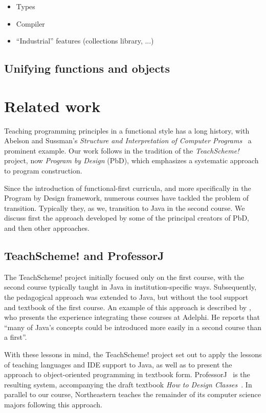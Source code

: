 \documentclass[submission,copyright]{eptcs}
\begin{document}
\begin{itemize}
\item Types
\item Compiler
\item ``Industrial'' features (collections library, ...)
\end{itemize}



\subsection{Unifying functions and objects}


\section{Related work}
\label{sec:related-work}

Teaching programming principles in a functional style has a long
history, with Abelson and Sussman's \emph{Structure and Interpretation
of Computer Programs}~\cite{dvanhorn:sicp} a prominent example.  Our
work follows in the tradition of the \emph{TeachScheme!} project, now
\emph{Program by Design} (PbD), which emphasizes a systematic
approach to program construction.  

Since the introduction of functional-first curricula, and more
specifically in the Program by Design framework, numerous courses have
tackled the problem of transition.  Typically they, as we, transition
to Java in the second course.  We discuss first the approach developed
by some of the principal creators of PbD, and then other approaches.

\subsection{TeachScheme! and ProfessorJ}

The TeachScheme! project initially focused only on the first course,
with the second course typically taught in Java in
institution-specific ways. Subsequently, the pedagogical approach was
extended to Java, but without the tool support and textbook of the
first course.  An example of this approach is described by
\citet{dvanhorn:Bloch2000Scheme}, who presents the experience
integrating these courses at Adelphi.  He reports that ``many of
Java's concepts could be introduced more easily in a second course
than a first''.

With these lessons in mind, the TeachScheme! project set out to apply
the lessons of teaching languages and IDE support to Java, as well as
to present the approach to object-oriented programming in textbook
form. ProfessorJ~\cite{dvanhorn:Gray2003ProfessorJ} is the resulting
system, accompanying the draft textbook \emph{How to Design
  Classes}~\cite{local:htdc}.  In parallel to our course, Northeastern
teaches the remainder of its computer science majors following this
approach.
\end{document}
